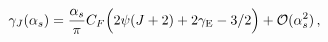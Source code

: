 \begin{equation}
\label{AnomalousDimension}
\gamma_J(\alpha_s)
=
\frac{\alpha_s}{\pi} C_F
\Big( 2 \psi (J + 2) + 2 \gamma_{\rm E} - 3/2 \Big)
+ \mathcal{O}(\alpha_s^2)
\, ,
\label{psi-func}
\end{equation}

